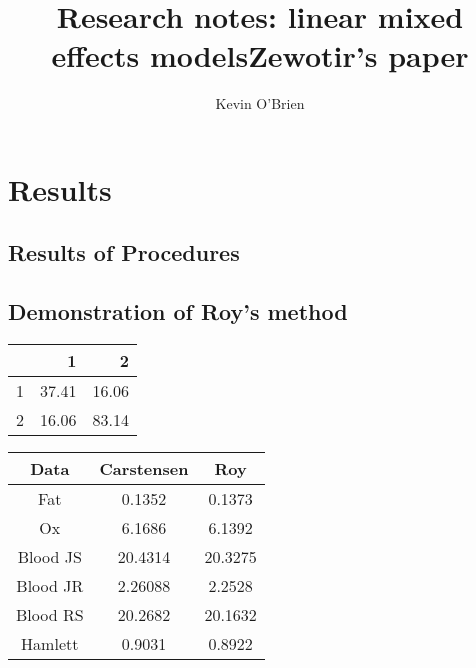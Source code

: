 \documentclass[12pt, a4paper]{report}
\title{Research notes: linear mixed effects models}
\author{ } \date{ }
\theoremstyle{plain}
\theoremstyle{definition}
\theoremstyle{remark}
\begin{document}
\author{Kevin O'Brien}
\title{Zewotir's paper}


\newpage
\chapter{Results}
\section{Results of Procedures}

\section{Demonstration of Roy's method}
\begin{table}[ht]
\begin{center}
\begin{tabular}{rrr}
  \hline
 & 1 & 2 \\
  \hline
1 & 37.41 & 16.06 \\
  2 & 16.06 & 83.14 \\
   \hline
\end{tabular}
\end{center}
\end{table}


\begin{centering}
\begin{tabular}{|c|c|c|}
  \hline
 Data & Carstensen & Roy \\
  \hline
  Fat &  0.1352 & 0.1373\\
  Ox & 6.1686 & 6.1392 \\
  Blood JS & 20.4314 & 20.3275
 \\
  Blood JR & 2.26088 & 2.2528
 \\
  Blood RS & 20.2682 & 20.1632
 \\
  Hamlett & 0.9031 & 0.8922

 \\
  \hline
\end{tabular}
\end{centering}


\end{document}
